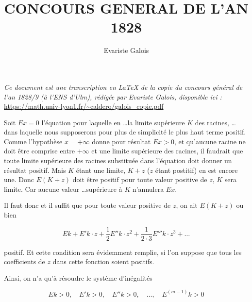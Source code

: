 \documentclass[11pt]{article}
\title{CONCOURS GENERAL DE L'AN 1828}
\author{Evariste Galois}
\date{}
\begin{document}
    
\maketitle

\textit{Ce document est une transcription en \LaTeX{} de la copie du concours g\'en\'eral de l'an 1828/9 (à l'ENS d'Ulm), r\'edig\'ee par Evariste Galois, disponible ici : }\url{https://math.univ-lyon1.fr/~caldero/galois_copie.pdf}\newline
\newline
    
Soit $Ex=0$ l'équation pour laquelle en \dots la limite supérieure $K$ des racines, \dots dans
laquelle nous supposerons pour plus de simplicité le plus haut terme positif. Comme 
l'hypothèse $x=+\infty$ donne pour résultat $Ex>0$, et qu'aucune racine ne doit être 
comprise entre $+\infty$ et une limite supérieure des racines, il faudrait que toute limite 
supérieure des racines substituée dans l'équation doit donner un résultat positif. Mais 
$K$ étant une limite, $K+z$ ($z$ étant postitif) en est encore une. Donc $E(K+z)$ doit 
être positif pour toute valeur positive de $z$, $K$ sera limite. Car aucune valeur \dots supérieure à
$K$ n'annulera $Ex$.

Il faut donc et il suffit que pour toute valeur positive de $z$, on ait $E(K+z)$ ou bien 

$$Ek+E'k\cdot z+\frac{1}{2}E''k\cdot z^2+\frac{1}{2\cdot 3}E'''k\cdot z^3+\dots$$

positif. Et cette condition sera évidemment remplie, si l'on suppose que tous les coefficients 
de $z$ dans cette fonction soient positifs.

Ainsi, on n'a qu'à résoudre le système d'inégalités 

$$Ek>0, \quad E'k>0, \quad E''k>0, \quad \dots, \quad E^{(m-1)}k>0$$
\end{document}
